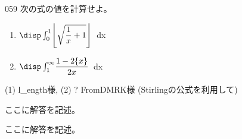 \begin{prob}{059}{}{}
 次の式の値を計算せよ。
 \begin{enumerate}
  \item $\disp \int_0^1\! \left\lfloor \sqrt{\dfrac{1}{x}+1} \right\rfloor$ \,dx
  \item $\disp \int_1^\infty\! \dfrac{1-2\{x\}}{2x}$ \,dx
 \end{enumerate}
 (1)  l\_ength様, (2) \hosi ? FromDMRK様 (Stirlingの公式を利用して)
\end{prob}
ここに解答を記述。

ここに解答を記述。